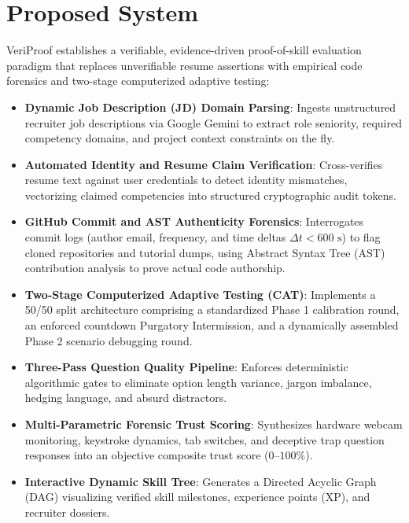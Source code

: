 \section{Proposed System}
VeriProof establishes a verifiable, evidence-driven proof-of-skill evaluation paradigm that replaces unverifiable resume assertions with empirical code forensics and two-stage computerized adaptive testing:
\begin{itemize}
    \item \textbf{Dynamic Job Description (JD) Domain Parsing}: Ingests unstructured recruiter job descriptions via Google Gemini to extract role seniority, required competency domains, and project context constraints on the fly.
    \item \textbf{Automated Identity and Resume Claim Verification}: Cross-verifies resume text against user credentials to detect identity mismatches, vectorizing claimed competencies into structured cryptographic audit tokens.
    \item \textbf{GitHub Commit and AST Authenticity Forensics}: Interrogates commit logs (author email, frequency, and time deltas $\Delta t < 600\text{ s}$) to flag cloned repositories and tutorial dumps, using Abstract Syntax Tree (AST) contribution analysis to prove actual code authorship.
    \item \textbf{Two-Stage Computerized Adaptive Testing (CAT)}: Implements a 50/50 split architecture comprising a standardized Phase 1 calibration round, an enforced countdown Purgatory Intermission, and a dynamically assembled Phase 2 scenario debugging round.
    \item \textbf{Three-Pass Question Quality Pipeline}: Enforces deterministic algorithmic gates to eliminate option length variance, jargon imbalance, hedging language, and absurd distractors.
    \item \textbf{Multi-Parametric Forensic Trust Scoring}: Synthesizes hardware webcam monitoring, keystroke dynamics, tab switches, and deceptive trap question responses into an objective composite trust score ($0$--$100\%$).
    \item \textbf{Interactive Dynamic Skill Tree}: Generates a Directed Acyclic Graph (DAG) visualizing verified skill milestones, experience points (XP), and recruiter dossiers.
\end{itemize}

